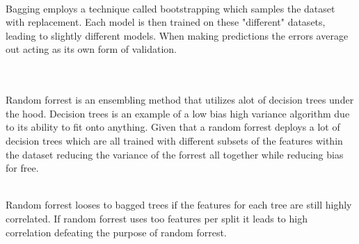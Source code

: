 \documentclass[12pt]{article}
\begin{document}
\begin{enumerate}
 \\ 
Bagging employs a technique called bootstrapping which samples the dataset with replacement. Each model is then trained on these "different" datasets, leading to slightly different models. When making predictions the errors average out acting as its own form of validation. 

 \\ \\ 
Random forrest is an ensembling method that utilizes alot of decision trees under the hood. Decision trees is an example of a low bias high variance algorithm due to its ability to fit onto anything. Given that a random forrest deploys a lot of decision trees which are all trained with different subsets of the features within the dataset reducing the variance of the forrest all together while reducing bias for free. 

 \\ 
Random forrest looses to bagged trees if the features for each tree are still highly correlated. If random forrest uses too features per split it leads to high correlation defeating the purpose of random forrest.
\end{enumerate} 


%
%
%
%
%
%
%
%
%
\end{document}
